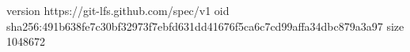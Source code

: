 version https://git-lfs.github.com/spec/v1
oid sha256:491b638fe7c30bf32973f7ebfd631dd41676f5ca6c7cd99affa34dbc879a3a97
size 1048672
